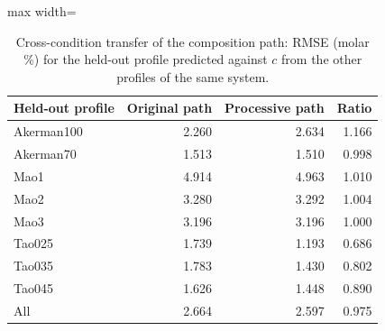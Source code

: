 \begin{table}[t]
\centering
\caption{Cross-condition transfer of the composition path: RMSE (molar \%) for the held-out profile predicted against $c$ from the other profiles of the same system.}\label{tab:transfer}
\footnotesize
\begin{adjustbox}{max width=\linewidth}
\begin{tabular}{lrrr}
\toprule
Held-out profile & Original path & Processive path & Ratio \\
\midrule
Akerman100 & 2.260 & 2.634 & 1.166 \\
Akerman70 & 1.513 & 1.510 & 0.998 \\
Mao1 & 4.914 & 4.963 & 1.010 \\
Mao2 & 3.280 & 3.292 & 1.004 \\
Mao3 & 3.196 & 3.196 & 1.000 \\
Tao025 & 1.739 & 1.193 & 0.686 \\
Tao035 & 1.783 & 1.430 & 0.802 \\
Tao045 & 1.626 & 1.448 & 0.890 \\
\midrule
All & 2.664 & 2.597 & 0.975 \\
\bottomrule
\end{tabular}
\end{adjustbox}
\end{table}
